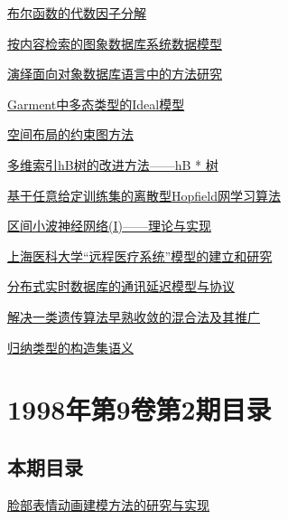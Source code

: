 \documentclass[a4paper]{article}
\begin{document}
\href{http://www.jos.org.cn/ch/reader/download_pdf.aspx?file_no=19980304&year_id=1998&quarter_id=3&falg=1}{布尔函数的代数因子分解}

\href{http://www.jos.org.cn/ch/reader/download_pdf.aspx?file_no=19980305&year_id=1998&quarter_id=3&falg=1}{按内容检索的图象数据库系统数据模型}

\href{http://www.jos.org.cn/ch/reader/download_pdf.aspx?file_no=19980306&year_id=1998&quarter_id=3&falg=1}{演绎面向对象数据库语言中的方法研究}

\href{http://www.jos.org.cn/ch/reader/download_pdf.aspx?file_no=19980307&year_id=1998&quarter_id=3&falg=1}{Garment中多态类型的Ideal模型}

\href{http://www.jos.org.cn/ch/reader/download_pdf.aspx?file_no=19980308&year_id=1998&quarter_id=3&falg=1}{空间布局的约束图方法}

\href{http://www.jos.org.cn/ch/reader/download_pdf.aspx?file_no=19980309&year_id=1998&quarter_id=3&falg=1}{多维索引hB树的改进方法——hB * 树}

\href{http://www.jos.org.cn/ch/reader/download_pdf.aspx?file_no=19980310&year_id=1998&quarter_id=3&falg=1}{基于任意给定训练集的离散型Hopfield网学习算法}

\href{http://www.jos.org.cn/ch/reader/download_pdf.aspx?file_no=19980311&year_id=1998&quarter_id=3&falg=1}{区间小波神经网络(I)——理论与实现}

\href{http://www.jos.org.cn/ch/reader/download_pdf.aspx?file_no=19980312&year_id=1998&quarter_id=3&falg=1}{上海医科大学“远程医疗系统”模型的建立和研究}

\href{http://www.jos.org.cn/ch/reader/download_pdf.aspx?file_no=19980313&year_id=1998&quarter_id=3&falg=1}{分布式实时数据库的通讯延迟模型与协议}

\href{http://www.jos.org.cn/ch/reader/download_pdf.aspx?file_no=19980314&year_id=1998&quarter_id=3&falg=1}{解决一类遗传算法早熟收敛的混合法及其推广}

\href{http://www.jos.org.cn/ch/reader/download_pdf.aspx?file_no=19980315&year_id=1998&quarter_id=3&falg=1}{归纳类型的构造集语义}


\section{\textbf{1998年第9卷第2期目录}}
\subsection{本期目录}
\href{http://www.jos.org.cn/ch/reader/download_pdf.aspx?file_no=19980201&year_id=1998&quarter_id=2&falg=1}{脸部表情动画建模方法的研究与实现}
\end{document}

